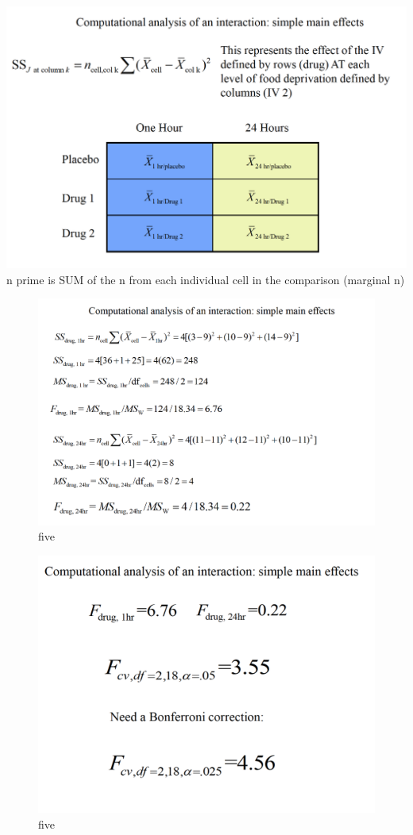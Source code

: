 \documentclass[]{book}
\theoremstyle{definition}
\theoremstyle{definition}
\theoremstyle{definition}
\theoremstyle{remark}
\begin{document}
\includegraphics{img/hicksfa19.png} n prime is SUM of the n from each
individual cell in the comparison (marginal n)

\begin{figure}
\centering
\includegraphics{img/hicksfa20.png}
\caption{five}
\end{figure}

\begin{figure}
\centering
\includegraphics{img/hicksfa21.png}
\caption{five}
\end{figure}
\end{document}
